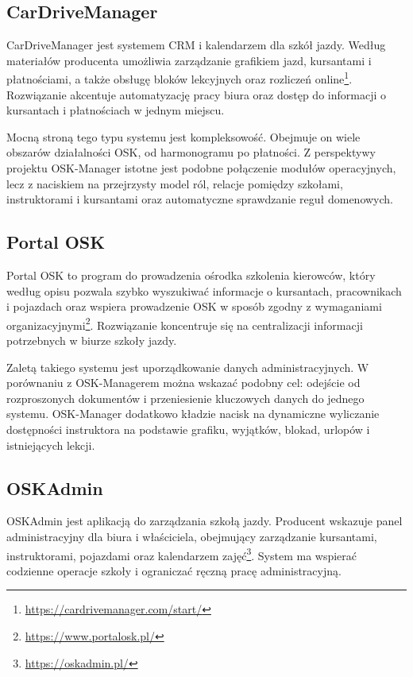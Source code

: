 \subsection{CarDriveManager}
\label{subsec:carDriveManager}

CarDriveManager jest systemem CRM i kalendarzem dla szkół jazdy. Według materiałów producenta umożliwia zarządzanie grafikiem jazd, kursantami i płatnościami, a także obsługę bloków lekcyjnych oraz rozliczeń online\footnote{\url{https://cardrivemanager.com/start/}}. Rozwiązanie akcentuje automatyzację pracy biura oraz dostęp do informacji o kursantach i płatnościach w jednym miejscu.

Mocną stroną tego typu systemu jest kompleksowość. Obejmuje on wiele obszarów działalności OSK, od harmonogramu po płatności. Z perspektywy projektu OSK-Manager istotne jest podobne połączenie modułów operacyjnych, lecz z naciskiem na przejrzysty model ról, relacje pomiędzy szkołami, instruktorami i kursantami oraz automatyczne sprawdzanie reguł domenowych.

\subsection{Portal OSK}
\label{subsec:portalOsk}

Portal OSK to program do prowadzenia ośrodka szkolenia kierowców, który według opisu pozwala szybko wyszukiwać informacje o kursantach, pracownikach i pojazdach oraz wspiera prowadzenie OSK w sposób zgodny z wymaganiami organizacyjnymi\footnote{\url{https://www.portalosk.pl/}}. Rozwiązanie koncentruje się na centralizacji informacji potrzebnych w biurze szkoły jazdy.

Zaletą takiego systemu jest uporządkowanie danych administracyjnych. W porównaniu z OSK-Managerem można wskazać podobny cel: odejście od rozproszonych dokumentów i przeniesienie kluczowych danych do jednego systemu. OSK-Manager dodatkowo kładzie nacisk na dynamiczne wyliczanie dostępności instruktora na podstawie grafiku, wyjątków, blokad, urlopów i istniejących lekcji.

\subsection{OSKAdmin}
\label{subsec:oskAdmin}

OSKAdmin jest aplikacją do zarządzania szkołą jazdy. Producent wskazuje panel administracyjny dla biura i właściciela, obejmujący zarządzanie kursantami, instruktorami, pojazdami oraz kalendarzem zajęć\footnote{\url{https://oskadmin.pl/}}. System ma wspierać codzienne operacje szkoły i ograniczać ręczną pracę administracyjną.

